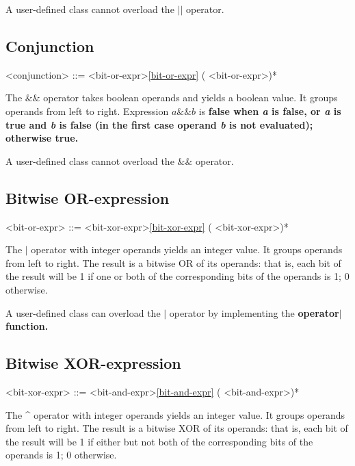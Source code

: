 \documentclass[a4paper,oneside,11pt]{article}
\begin{document}
A user-defined class cannot overload the $||$ operator.

\subsection{Conjunction}

\begin{grammar}
\label{conjunction}<conjunction> ::= <bit-or-expr>\ref{bit-or-expr} (\lit*{\&\&} <bit-or-expr>)*
\end{grammar}

The $\&\&$ operator takes boolean operands and yields a boolean value. It groups operands from left to right.
Expression $a \&\& b$ is \bf{false} when \emph{a} is \bf{false}, or \emph{a} is \bf{true} and \emph{b} is \bf{false}
(in the first case operand \emph{b} is not evaluated); otherwise \bf{true}.

A user-defined class cannot overload the $\&\&$ operator.

\subsection{Bitwise OR-expression}

\begin{grammar}
\label{bit-or-expr}<bit-or-expr> ::= <bit-xor-expr>\ref{bit-xor-expr} (\lit*{|} <bit-xor-expr>)*
\end{grammar}

The $|$ operator with integer operands yields an integer value. It groups operands from left to right.
The result is a bitwise OR of its operands:
that is, each bit of the result will be 1 if one or both of the corresponding bits of the operands is 1; 0 otherwise.

A user-defined class can overload the $|$ operator by implementing the \bf{operator$|$} function.

\subsection{Bitwise XOR-expression}

\begin{grammar}
\label{bit-xor-expr}<bit-xor-expr> ::= <bit-and-expr>\ref{bit-and-expr} (\lit*{\^} <bit-and-expr>)*
\end{grammar}

The \^{} operator with integer operands yields an integer value. It groups operands from left to right.
The result is a bitwise XOR of its operands:
that is, each bit of the result will be 1 if either but not both of the corresponding bits of the operands is 1; 0 otherwise.
\end{document}
